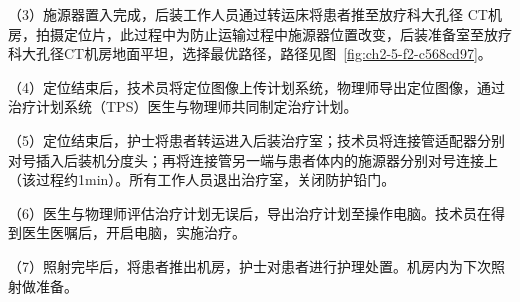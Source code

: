 （3）施源器置入完成，后装工作人员通过转运床将患者推至放疗科大孔径 CT机房，拍摄定位片，此过程中为防止运输过程中施源器位置改变，后装准备室至放疗科大孔径CT机房地面平坦，选择最优路径，路径见图~\ref{fig:ch2-5-f2-c568cd97}。

（4）定位结束后，技术员将定位图像上传计划系统，物理师导出定位图像，通过治疗计划系统（TPS）医生与物理师共同制定治疗计划。

（5）定位结束后，护士将患者转运进入后装治疗室；技术员将连接管适配器分别对号插入后装机分度头；再将连接管另一端与患者体内的施源器分别对号连接上（该过程约1min）。所有工作人员退出治疗室，关闭防护铅门。

（6）医生与物理师评估治疗计划无误后，导出治疗计划至操作电脑。技术员在得到医生医嘱后，开启电脑，实施治疗。

（7）照射完毕后，将患者推出机房，护士对患者进行护理处置。机房内为下次照射做准备。

